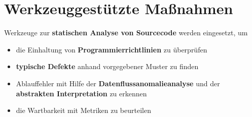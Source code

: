 \section{Werkzeuggestützte Maßnahmen}


\begin{tcolorbox}[title={Werkzeuggestützte Maßnahmen}]
\item Werkzeuge zur \textbf{statischen Analyse von Sourcecode} werden eingesetzt, um
\begin{itemize}
    \item die Einhaltung von \textbf{Programmierrichtlinien} zu überprüfen
    \item \textbf{typische Defekte} anhand vorgegebener Muster zu finden
    \item Ablauffehler mit Hilfe der \textbf{Datenflussanomalieanalyse} und der \textbf{abstrakten Interpretation} zu erkennen
    \item die Wartbarkeit mit Metriken zu beurteilen
\end{itemize}
\end{tcolorbox}